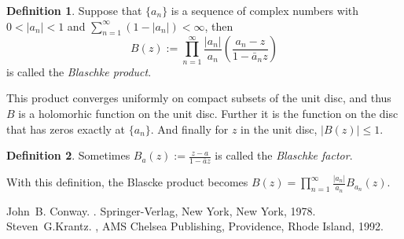 \documentclass[12pt]{article}
\theoremstyle{theorem}
\theoremstyle{definition}
\newtheorem*{defn}{Definition}
\begin{document}
\begin{defn}
Suppose that $\{ a_n \}$ is a sequence of complex numbers with $0 < \lvert a_n \rvert < 1$ and $\sum_{n=1}^\infty (1 - \lvert a_n \rvert) < \infty$, then
\begin{equation*}
B(z) := \prod_{n=1}^\infty \frac{\lvert a_n \rvert}{a_n} \left(
\frac{a_n - z}{1-\bar{a}_nz} \right)
\end{equation*}
is called the {\em Blaschke product}.
\end{defn}

This product converges uniformly on compact subsets of the unit disc, and thus $B$ is
a holomorhic function on the unit disc.
Further it is the function on the disc that has zeros exactly at $\{ a_n \}$.
And finally for $z$ in the unit
disc, $\left\lvert B(z) \right\rvert \leq 1$.


\begin{defn}
Sometimes $B_a(z) := \frac{z-a}{1-\bar{a}z}$ is called the {\em Blaschke factor}.
\end{defn}

With this definition, the Blascke product becomes $B(z) = \prod_{n=1}^\infty
\frac{\lvert a_n \rvert}{a_n} B_{a_n}(z)$.

%
%

\begin{thebibliography}{9}
John~B. Conway.
{\em {}}.
Springer-Verlag, New York, New York, 1978.
Steven~G.\@ Krantz.
{\em {}},
AMS Chelsea Publishing, Providence, Rhode Island, 1992.
\end{thebibliography}
\end{document}
